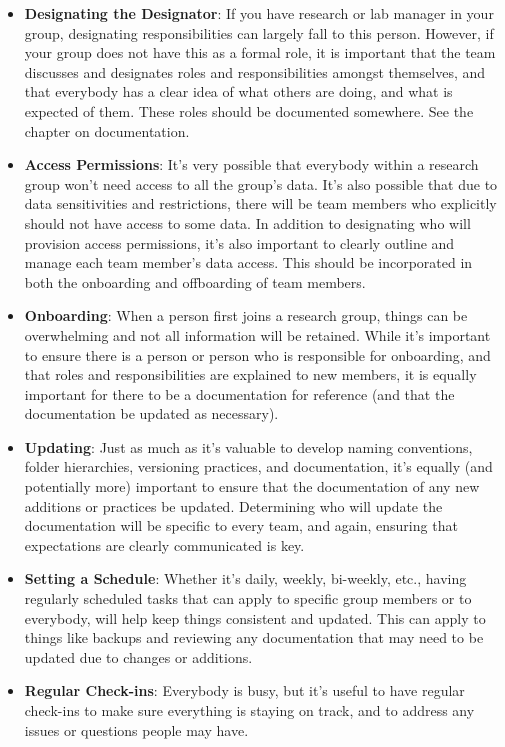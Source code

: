 \documentclass[
]{book}
\providecommand{\tightlist}{%
  \setlength{\itemsep}{0pt}\setlength{\parskip}{0pt}}
\begin{document}
\begin{itemize}
\tightlist
\item
  \textbf{Designating the Designator}: If you have research or lab manager in your group, designating responsibilities can largely fall to this person. However, if your group does not have this as a formal role, it is important that the team discusses and designates roles and responsibilities amongst themselves, and that everybody has a clear idea of what others are doing, and what is expected of them. These roles should be documented somewhere. See the chapter on documentation.
\item
  \textbf{Access Permissions}: It's very possible that everybody within a research group won't need access to all the group's data. It's also possible that due to data sensitivities and restrictions, there will be team members who explicitly should not have access to some data. In addition to designating who will provision access permissions, it's also important to clearly outline and manage each team member's data access. This should be incorporated in both the onboarding and offboarding of team members.
\item
  \textbf{Onboarding}: When a person first joins a research group, things can be overwhelming and not all information will be retained. While it's important to ensure there is a person or person who is responsible for onboarding, and that roles and responsibilities are explained to new members, it is equally important for there to be a documentation for reference (and that the documentation be updated as necessary).
\item
  \textbf{Updating}: Just as much as it's valuable to develop naming conventions, folder hierarchies, versioning practices, and documentation, it's equally (and potentially more) important to ensure that the documentation of any new additions or practices be updated. Determining who will update the documentation will be specific to every team, and again, ensuring that expectations are clearly communicated is key.
\item
  \textbf{Setting a Schedule}: Whether it's daily, weekly, bi-weekly, etc., having regularly scheduled tasks that can apply to specific group members or to everybody, will help keep things consistent and updated. This can apply to things like backups and reviewing any documentation that may need to be updated due to changes or additions.
\item
  \textbf{Regular Check-ins}: Everybody is busy, but it's useful to have regular check-ins to make sure everything is staying on track, and to address any issues or questions people may have.
\end{itemize}
\end{document}
